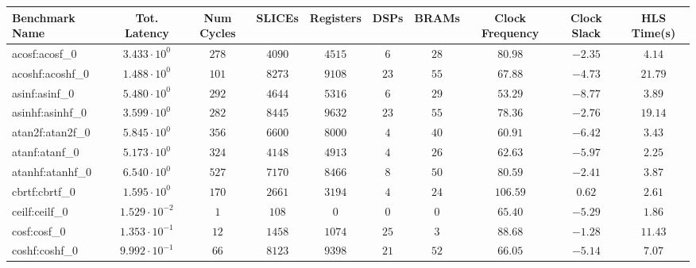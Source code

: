 \begin{tabular}{|l|c|c|c|c|c|c|c|c|c|}
\hline
Benchmark Name           & Tot. Latency            & Num Cycles & SLICEs     & Registers  & DSPs    & BRAMs   & Clock Frequency & Clock Slack & HLS Time(s) \\
\hline
acosf:acosf\_0           & $ 3.433 \cdot 10^{0}  $ & $ 278    $ & $ 4090   $ & $ 4515   $ & $ 6   $ & $ 28  $ & $ 80.98       $ & $ -2.35   $ & $ 4.14    $ \\
acoshf:acoshf\_0         & $ 1.488 \cdot 10^{0}  $ & $ 101    $ & $ 8273   $ & $ 9108   $ & $ 23  $ & $ 55  $ & $ 67.88       $ & $ -4.73   $ & $ 21.79   $ \\
asinf:asinf\_0           & $ 5.480 \cdot 10^{0}  $ & $ 292    $ & $ 4644   $ & $ 5316   $ & $ 6   $ & $ 29  $ & $ 53.29       $ & $ -8.77   $ & $ 3.89    $ \\
asinhf:asinhf\_0         & $ 3.599 \cdot 10^{0}  $ & $ 282    $ & $ 8445   $ & $ 9632   $ & $ 23  $ & $ 55  $ & $ 78.36       $ & $ -2.76   $ & $ 19.14   $ \\
atan2f:atan2f\_0         & $ 5.845 \cdot 10^{0}  $ & $ 356    $ & $ 6600   $ & $ 8000   $ & $ 4   $ & $ 40  $ & $ 60.91       $ & $ -6.42   $ & $ 3.43    $ \\
atanf:atanf\_0           & $ 5.173 \cdot 10^{0}  $ & $ 324    $ & $ 4148   $ & $ 4913   $ & $ 4   $ & $ 26  $ & $ 62.63       $ & $ -5.97   $ & $ 2.25    $ \\
atanhf:atanhf\_0         & $ 6.540 \cdot 10^{0}  $ & $ 527    $ & $ 7170   $ & $ 8466   $ & $ 8   $ & $ 50  $ & $ 80.59       $ & $ -2.41   $ & $ 3.87    $ \\
cbrtf:cbrtf\_0           & $ 1.595 \cdot 10^{0}  $ & $ 170    $ & $ 2661   $ & $ 3194   $ & $ 4   $ & $ 24  $ & $ 106.59      $ & $ 0.62    $ & $ 2.61    $ \\
ceilf:ceilf\_0           & $ 1.529 \cdot 10^{-2} $ & $ 1      $ & $ 108    $ & $ 0      $ & $ 0   $ & $ 0   $ & $ 65.40       $ & $ -5.29   $ & $ 1.86    $ \\
cosf:cosf\_0             & $ 1.353 \cdot 10^{-1} $ & $ 12     $ & $ 1458   $ & $ 1074   $ & $ 25  $ & $ 3   $ & $ 88.68       $ & $ -1.28   $ & $ 11.43   $ \\
coshf:coshf\_0           & $ 9.992 \cdot 10^{-1} $ & $ 66     $ & $ 8123   $ & $ 9398   $ & $ 21  $ & $ 52  $ & $ 66.05       $ & $ -5.14   $ & $ 7.07    $ \\

\end{tabular}
